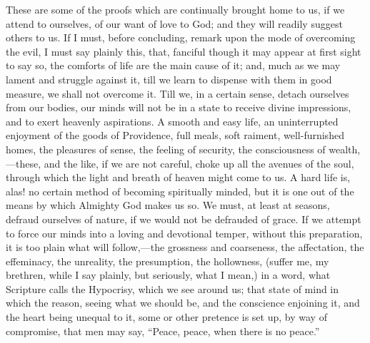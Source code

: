 These are some of the proofs which are continually brought home to
us, if we attend to ourselves, of our want of love to God; and they
will readily suggest others to us. If I must, before concluding,
remark upon the mode of overcoming the evil, I must say plainly this,
that, fanciful though it may appear at first sight to say so, the
comforts of life are the main cause of it; and, much as we may lament
and struggle against it, till we learn to dispense with them in good
measure, we shall not overcome it. Till we, in a certain sense, detach
ourselves from our bodies, our minds will not be in a state to receive
divine impressions, and to exert heavenly aspirations. A smooth and
easy life, an uninterrupted enjoyment of the goods of Providence, full
meals, soft raiment, well-furnished homes, the pleasures of sense, the
feeling of security, the consciousness of wealth,—these, and the
like, if we are not careful, choke up all the avenues of the soul,
through which the light and breath of heaven might come to us. A hard
life is, alas! no certain method of becoming spiritually minded, but
it is one out of the means by which Almighty God makes us so. We must,
at least at seasons, defraud ourselves of nature, if we would not be
defrauded of grace. If we attempt to force our minds into a loving and
devotional temper, without this preparation, it is too plain what will
follow,—the grossness and coarseness, the affectation, the
effeminacy, the unreality, the presumption, the hollowness, (suffer
me, my brethren, while I say plainly, but seriously, what I mean,) in
a word, what Scripture calls the Hypocrisy, which we see around us;
that state of mind in which the reason, seeing what we should be, and
the conscience enjoining it, and the heart being unequal to it, some
or other pretence is set up, by way of compromise, that men may say,
``Peace, peace, when there is no peace.''

